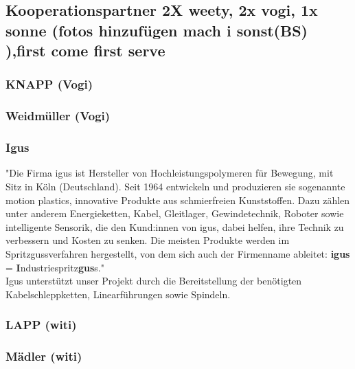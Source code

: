 \subsection{Kooperationspartner 2X weety, 2x vogi, 1x sonne  (fotos hinzufügen mach i sonst(BS) ),first come first serve}

\subsubsection{KNAPP (Vogi)}

\subsubsection{Weidmüller (Vogi)}

\subsubsection{Igus}
"Die Firma igus ist Hersteller von Hochleistungspolymeren für Bewegung, mit Sitz in Köln (Deutschland). Seit 1964 entwickeln und produzieren sie sogenannte motion plastics, innovative Produkte aus schmierfreien Kunststoffen. Dazu zählen unter anderem Energieketten, Kabel, Gleitlager, Gewindetechnik, Roboter sowie intelligente Sensorik, die den Kund:innen von igus, dabei helfen, ihre Technik zu verbessern und Kosten zu senken. Die meisten Produkte werden im Spritzgussverfahren hergestellt, von dem sich auch der Firmenname ableitet: \textbf{igus} = \textbf{I}ndustriespritz\textbf{gus}s." \cite{igus} \\
Igus unterstützt unser Projekt durch die Bereitstellung der benötigten Kabelschleppketten, Linearführungen sowie Spindeln.


\subsubsection{LAPP (witi)}

\subsubsection{Mädler (witi)}




